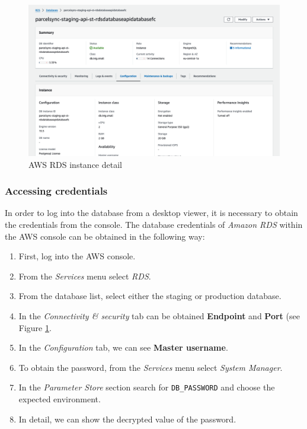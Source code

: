 \begin{figure}[H]\centering
\includegraphics[width=140mm]{img/docs/fig_aws_rds.png}
\caption{AWS RDS instance detail}
\label{img:admin-manual-aws.rds.detail}
\end{figure}

\subsubsection{Accessing credentials}
In order to log into the database from a desktop viewer, it is necessary to obtain the credentials from the console. 
The database credentials of \textit{Amazon RDS} within the AWS console can be obtained in the following way:
\begin{enumerate}
    \item First, log into the AWS console.
    \item From the \textit{Services} menu select \textit{RDS}.
    \item From the database list, select either the staging or production database.
    \item In the \textit{Connectivity \& security} tab can be obtained \textbf{Endpoint} and \textbf{Port} (see Figure \ref{img:admin-manual-aws.rds.detail}.
    \item In the \textit{Configuration} tab, we can see \textbf{Master username}.
    \item To obtain the password, from the \textit{Services} menu select \textit{System Manager}.
    \item In the \textit{Parameter Store} section search for \texttt{DB\_PASSWORD} and choose the expected environment.
    \item In detail, we can show the decrypted value of the password.
\end{enumerate}


